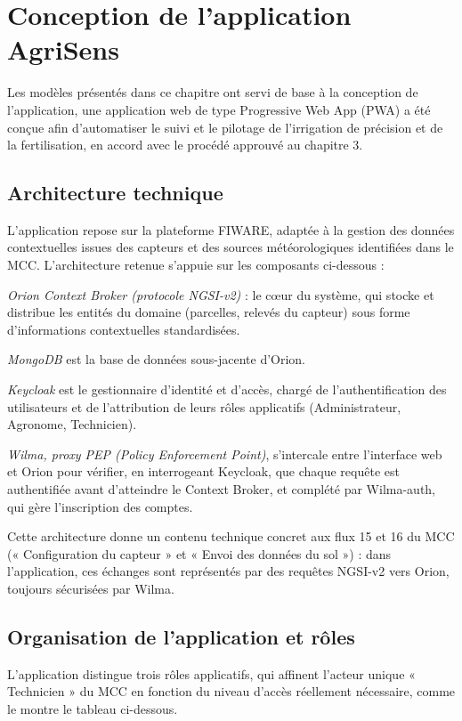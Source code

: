 \section{Conception de l’application AgriSens}
Les modèles présentés dans ce chapitre ont servi de base à la conception de l'application, une application web de type Progressive Web App (PWA) a été conçue afin d’automatiser le suivi et le pilotage de l'irrigation de précision et de la fertilisation, en accord avec le procédé approuvé au chapitre 3.

\subsection{Architecture technique}
L'application repose sur la plateforme FIWARE, adaptée à la gestion des données contextuelles issues des capteurs et des sources météorologiques identifiées dans le MCC. L’architecture retenue s’appuie sur les composants ci-dessous : 

\textit{Orion Context Broker (protocole NGSI-v2)} : le cœur du système, qui stocke et distribue les entités du domaine (parcelles, relevés du capteur) sous forme d'informations contextuelles standardisées.

\textit{MongoDB} est la base de données sous-jacente d'Orion.

\textit{Keycloak} est le gestionnaire d'identité et d'accès, chargé de l'authentification des utilisateurs et de l'attribution de leurs rôles applicatifs (Administrateur, Agronome, Technicien).

\textit{Wilma, proxy PEP (Policy Enforcement Point)}, s’intercale entre l'interface web et Orion pour vérifier, en interrogeant Keycloak, que chaque requête est authentifiée avant d'atteindre le Context Broker, et complété par Wilma-auth, qui gère l'inscription des comptes.

Cette architecture donne un contenu technique concret aux flux 15 et 16 du MCC (« Configuration du capteur » et « Envoi des données du sol ») : dans l'application, ces échanges sont représentés par des requêtes NGSI-v2 vers Orion, toujours sécurisées par Wilma.

\subsection{Organisation de l’application et rôles}
L'application distingue trois rôles applicatifs, qui affinent l'acteur unique « Technicien » du MCC en fonction du niveau d'accès réellement nécessaire, comme le montre le tableau ci-dessous.

